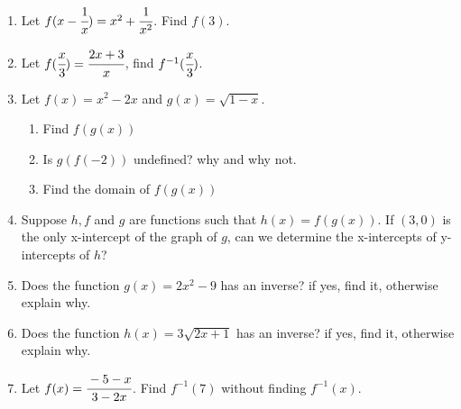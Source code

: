 \documentclass[letterpaper,12pt]{article}
\begin{document}
\begin{enumerate}
    \item Let $f(x-\cfrac{1}{x})=x^2+\cfrac{1}{x^2}$. Find $f(3)$.
    \item Let $f(\cfrac{x}{3})=\cfrac{2x+3}{x}$, find $f^{-1}(\cfrac{x}{3})$.
    \item Let $f(x)=x^2-2x$ and $g(x)=\sqrt{1-x}$.
        \begin{enumerate}
            \item Find $f(g(x))$
            \item Is $g(f(-2))$ undefined? why and why not.
            \item Find the domain of $f(g(x))$
        \end{enumerate}
    \item Suppose $h, f$ and $g$ are functions such that $h(x)=f(g(x))$. If $(3,0)$ is the only x-intercept of the graph of $g$,
    can we determine the x-intercepts of y-intercepts of $h$?
    \item Does the function $g(x)=2x^2-9$ has an inverse? if yes, find it, otherwise explain why.
    \item Does the function $h(x)=3\sqrt{2x+1}$ has an inverse? if yes, find it, otherwise explain why.
    \item Let $f(x)=\cfrac{-5-x}{3-2x}$. Find $f^{-1}(7)$ without finding $f^{-1}(x)$.
\end{enumerate}
\end{document}
